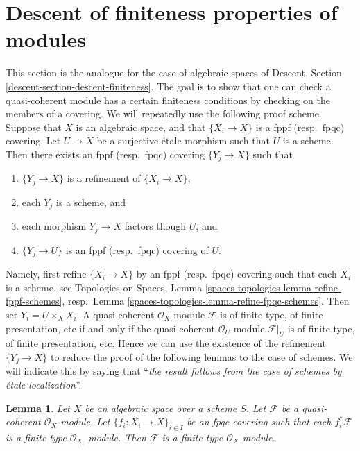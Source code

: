 \documentclass{stacks-project}
\theoremstyle{plain}
\newtheorem{lemma}[subsection]{Lemma}
\theoremstyle{definition}
\theoremstyle{remark}
\numberwithin{equation}{subsection}
\begin{document}
\section{Descent of finiteness properties of modules}
\label{section-descent-finiteness}

\noindent
This section is the analogue for the case of algebraic spaces of
Descent, Section \ref{descent-section-descent-finiteness}.
The goal is to show that one can check a quasi-coherent module
has a certain finiteness conditions by checking on the members of
a covering. We will repeatedly use the following proof scheme.
Suppose that $X$ is an algebraic space, and that $\{X_i \to X\}$
is a fppf (resp.\ fpqc) covering. Let $U \to X$ be a surjective
\'etale morphism such that $U$ is a scheme. Then there exists an
fppf (resp.\ fpqc) covering $\{Y_j \to X\}$ such that
\begin{enumerate}
\item $\{Y_j \to X\}$ is a refinement of $\{X_i \to X\}$,
\item each $Y_j$ is a scheme, and
\item each morphism $Y_j \to X$ factors though $U$, and
\item $\{Y_j \to U\}$ is an fppf (resp.\ fpqc) covering of $U$.
\end{enumerate}
Namely, first refine $\{X_i \to X\}$ by an fppf (resp.\ fpqc)
covering such that each $X_i$ is a scheme, see
Topologies on Spaces, Lemma \ref{spaces-topologies-lemma-refine-fppf-schemes},
resp.\ Lemma \ref{spaces-topologies-lemma-refine-fpqc-schemes}.
Then set $Y_i = U \times_X X_i$. A quasi-coherent
$\mathcal{O}_X$-module $\mathcal{F}$ is of finite type, of
finite presentation, etc if and only if the quasi-coherent
$\mathcal{O}_U$-module $\mathcal{F}|_U$ is of finite type, of
finite presentation, etc. Hence we can use the existence of the
refinement $\{Y_j \to X\}$ to reduce the proof of the following
lemmas to the case of schemes. We will indicate this by saying
that ``{\it the result follows from the case of schemes by
\'etale localization}''.

\begin{lemma}
\label{lemma-finite-type-descends}
Let $X$ be an algebraic space over a scheme $S$.
Let $\mathcal{F}$ be a quasi-coherent $\mathcal{O}_X$-module.
Let $\{f_i : X_i \to X\}_{i \in I}$ be an fpqc covering such that
each $f_i^*\mathcal{F}$ is a finite type $\mathcal{O}_{X_i}$-module.
Then $\mathcal{F}$ is a finite type $\mathcal{O}_X$-module.
\end{lemma}
\end{document}
